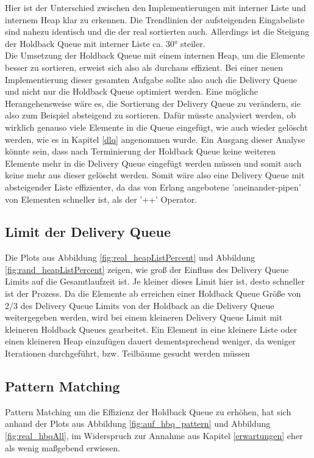 Hier ist der Unterschied zwischen den Implementierungen mit interner Liste und internem Heap klar zu erkennen. Die Trendlinien der aufsteigenden Eingabeliste sind nahezu identisch und die der real sortierten auch. Allerdings ist die Steigung der Holdback Queue mit interner Liste ca. 30° steiler. \\ Die Umsetzung der Holdback Queue mit einem internen Heap, um die Elemente besser zu sortieren, erweist sich also als durchaus effizient. Bei einer neuen Implementierung dieser gesamten Aufgabe sollte also auch die Delivery Queue und nicht nur die Holdback Queue optimiert werden. Eine mögliche Herangehensweise wäre es, die Sortierung der Delivery Queue zu verändern, sie also zum Beispiel absteigend zu sortieren. Dafür müsste analysiert werden, ob wirklich genauso viele Elemente in die Queue eingefügt, wie auch wieder gelöscht werden, wie es in Kapitel \ref{dlq} angenommen wurde. Ein Ausgang dieser Analyse könnte sein, dass nach Terminierung der Holdback Queue keine weiteren Elemente mehr in die Delivery Queue eingefügt werden müssen und somit auch keine mehr aus dieser gelöscht werden. Somit wäre also eine Delivery Queue mit absteigender Liste effizienter, da das von Erlang angebotene 'aneinander-pipen' von Elementen schneller ist, als der '++' Operator.

\subsection{Limit der Delivery Queue}

Die Plots aus Abbildung \ref{fig:real_heapListPercent} und Abbildung \ref{fig:rand_heapListPercent} zeigen, wie groß der Einfluss des Delivery Queue Limits auf die Gesamtlaufzeit ist. Je kleiner dieses Limit hier ist, desto schneller ist der Prozess. Da die Elemente ab erreichen einer Holdback Queue Größe von 2/3 des Delivery Queue Limits von der Holdback an die Delivery Queue weitergegeben werden, wird bei einem kleineren Delivery Queue Limit mit kleineren Holdback Queues gearbeitet. Ein Element in eine kleinere Liste oder einen kleineren Heap einzufügen dauert dementsprechend weniger, da weniger Iterationen durchgeführt, bzw. Teilbäume gesucht werden müssen

\subsection{Pattern Matching}
Pattern Matching um die Effizienz der Holdback Queue zu erhöhen, hat sich anhand der Plots aus Abbildung \ref{fig:auf_hbq_pattern} und Abbildung \ref{fig:real_hbqAll}, im Widerspruch zur Annahme aus Kapitel \ref{erwartungen} eher als wenig maßgebend erwiesen. 

